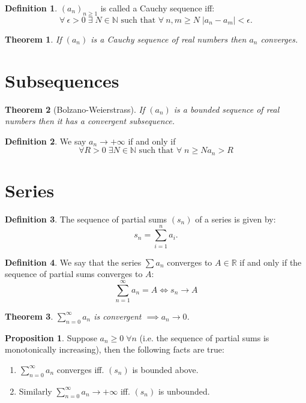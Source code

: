 \documentclass[11pt,a4paper]{article}
\newcommand\R{\mathbb{R}}
\newcommand\N{\mathbb{N}}
\newcommand\st{\text{ such that }}
\newcommand\sumOfSeries{\sum_{n = 0}^{\infty}}
\newtheorem{theorem}{Theorem}
\theoremstyle{definition}
\newtheorem{definition}{Definition}
\newtheorem{proposition}{Proposition}
\begin{document}
\begin{definition}
    $ (a_n)_{n \geq 1} $ is called a Cauchy sequence iff: 
    \[ \forall \: \epsilon > 0 \; \exists \; N \in \N \st \forall \: n, m \geq N \; |a_n - a_m| < \epsilon. \]
\end{definition}

\begin{theorem}
    If $ (a_n) $ is a Cauchy sequence of real numbers then $ a_n $ converges.
\end{theorem}

\section{Subsequences}

\begin{theorem}[Bolzano-Weierstrass]
    If $ (a_n) $ is a bounded sequence of real numbers then it has a convergent subsequence.
\end{theorem}

\begin{definition}
    We say $ a_n \to +\infty $ if and only if 
    \[ \forall R > 0 \; \exists N \in \N \st \forall \; n \geq N a_n > R\] 
\end{definition}

\section{Series}

\begin{definition}
    The sequence of partial sums $ (s_n) $ of a series is given by:
    \[ s_n = \sum_{i=1}^n a_i.\]
\end{definition}

\begin{definition}
    We say that the series $ \sum a_n $ converges to $ A \in \R $ if and only if the sequence of partial sums converges to $ A $:
    \[ \sum_{n = 1}^{\infty} a_n = A \iff s_n \to A \]
\end{definition}

\begin{theorem}
    $ \sumOfSeries a_n $ is convergent $ \implies a_n \to 0$.
\end{theorem}

\begin{proposition}
    Suppose $a_n \geq 0 \; \forall n $ (i.e. the sequence of partial sums is monotonically increasing), then the following facts are true:
    \begin{enumerate}
        \item $ \sumOfSeries a_n $ converges iff. $ (s_n) $ is bounded above.
        \item Similarly $ \sumOfSeries a_n \to +\infty$ iff. $ (s_n) $ is unbounded. 
    \end{enumerate}
\end{proposition}
\end{document}
